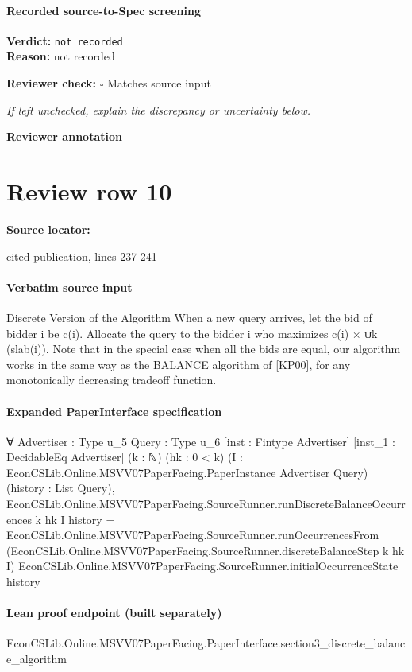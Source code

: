 \documentclass[10pt]{article}
\newcommand{\reviewerbox}{%
  \par\noindent\fbox{\parbox{0.96\linewidth}{\rule{0pt}{0.38in}}}\par
}
\newcommand{\reviewmatch}[1]{%
  \par\noindent\textbf{Reviewer check:} $\square$\; #1\par
  \noindent\emph{If left unchecked, explain the discrepancy or uncertainty below.}\par
}
\begin{document}
\paragraph{Recorded source-to-Spec screening}
\textbf{Verdict:} \texttt{not recorded}
\\
\textbf{Reason:} not recorded
\reviewmatch{Matches source input}
\noindent\textbf{Reviewer annotation}\par
\reviewerbox
\clearpage
\hypertarget{source-claim-a30559fb9711d61f}{}
\section*{Review row 10}
\textbf{Source locator:} {\footnotesize\raggedright cited publication, lines 237-\allowbreak{}241\par}
\paragraph{Verbatim source input}
\begin{ReviewVerbatim}
Discrete Version of the Algorithm
When a new query arrives, let the bid of bidder i be c(i). Allocate the query to the
bidder i who maximizes c(i) × ψk (slab(i)).
Note that in the special case when all the bids are equal, our algorithm works in the same way
as the BALANCE algorithm of [KP00], for any monotonically decreasing tradeoff function.
\end{ReviewVerbatim}


\paragraph{Expanded PaperInterface specification}
\begin{ReviewVerbatim}
∀ {Advertiser : Type u_5} {Query : Type u_6} [inst : Fintype Advertiser] [inst_1 : DecidableEq Advertiser] (k : ℕ)
  (hk : 0 < k) (I : EconCSLib.Online.MSVV07PaperFacing.PaperInstance Advertiser Query) (history : List Query),
  EconCSLib.Online.MSVV07PaperFacing.SourceRunner.runDiscreteBalanceOccurrences k hk I history =
    EconCSLib.Online.MSVV07PaperFacing.SourceRunner.runOccurrencesFrom
      (EconCSLib.Online.MSVV07PaperFacing.SourceRunner.discreteBalanceStep k hk I)
      EconCSLib.Online.MSVV07PaperFacing.SourceRunner.initialOccurrenceState history
\end{ReviewVerbatim}

\paragraph{Lean proof endpoint (built separately)}\begin{ReviewVerbatim}
EconCSLib.Online.MSVV07PaperFacing.PaperInterface.section3_discrete_balance_algorithm
\end{ReviewVerbatim}
\end{document}
